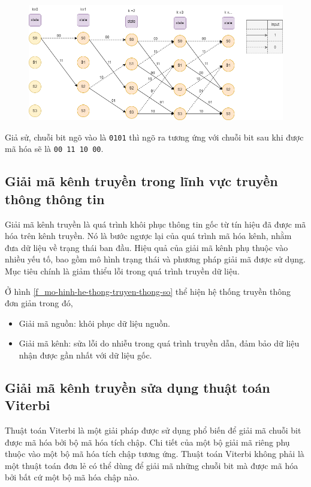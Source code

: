\begin{figure}[H]
	\centering
	\includegraphics[width = \linewidth]{sections/pic/cosolythuyet/trellis-fsm-convolutional-code.png}
	\label{f_trellis_conv_encoder}
\end{figure}

Giả sử, chuỗi bit ngõ vào là \texttt{0101} thì ngõ ra tương ứng với chuỗi bit sau khi được mã hóa sẽ là \texttt{00 11 10 00}.

\subsection{Giải mã kênh truyền trong lĩnh vực truyền thông thông tin}

Giải mã kênh truyền là quá trình khôi phục thông tin gốc từ tín hiệu đã được mã hóa trên kênh truyền. Nó là bước ngược lại của quá trình mã hóa kênh, nhằm đưa dữ liệu về trạng thái ban đầu. Hiệu quả của giải mã kênh phụ thuộc vào nhiều yếu tố, bao gồm mô hình trạng thái và phương pháp giải mã được sử dụng. Mục tiêu chính là giảm thiểu lỗi trong quá trình truyền dữ liệu.

Ở hình \ref{f_mo-hinh-he-thong-truyen-thong-so} thể hiện hệ thống truyền thông đơn giản trong đó,

\begin{itemize}[label=-]
	\item Giải mã nguồn: khôi phục dữ liệu nguồn.
	\item Giải mã kênh: sửa lỗi do nhiễu trong quá trình truyền dẫn, đảm bảo dữ liệu nhận được gần nhất với dữ liệu gốc.
\end{itemize}

\subsection{Giải mã kênh truyền sửa dụng thuật toán Viterbi}

Thuật toán Viterbi là một giải pháp được sử dụng phổ biến để giải mã chuỗi bit được mã hóa bởi bộ mã hóa tích chập. Chi tiết của một bộ giải mã riêng phụ thuộc vào một bộ mã hóa tích chập tương ứng. Thuật toán Viterbi không phải là một thuật toán đơn lẻ có thể dùng để giải mã những chuỗi bit mà được mã hóa bởi bất cứ một bộ mã hóa chập nào.

